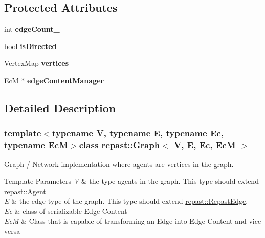 \subsection*{Protected Attributes}
\begin{DoxyCompactItemize}
\item 
\hypertarget{classrepast_1_1_graph_a4cf91f79bf224e8550d31a500fc2a47a}{int {\bfseries edge\-Count\-\_\-}}\label{classrepast_1_1_graph_a4cf91f79bf224e8550d31a500fc2a47a}

\item 
\hypertarget{classrepast_1_1_graph_a31bc527fc394104d5d2252d7302e8bff}{bool {\bfseries is\-Directed}}\label{classrepast_1_1_graph_a31bc527fc394104d5d2252d7302e8bff}

\item 
\hypertarget{classrepast_1_1_graph_a12f010263d0a805926ff66e54dbd8ae5}{Vertex\-Map {\bfseries vertices}}\label{classrepast_1_1_graph_a12f010263d0a805926ff66e54dbd8ae5}

\item 
\hypertarget{classrepast_1_1_graph_ab4cab2042913e901d8a9eb2c170da6de}{Ec\-M $\ast$ {\bfseries edge\-Content\-Manager}}\label{classrepast_1_1_graph_ab4cab2042913e901d8a9eb2c170da6de}

\end{DoxyCompactItemize}


\subsection{Detailed Description}
\subsubsection*{template$<$typename V, typename E, typename Ec, typename Ec\-M$>$class repast\-::\-Graph$<$ V, E, Ec, Ec\-M $>$}

\hyperlink{classrepast_1_1_graph}{Graph} / Network implementation where agents are vertices in the graph. 


\begin{DoxyTemplParams}{Template Parameters}
{\em V} & the type agents in the graph. This type should extend \hyperlink{classrepast_1_1_agent}{repast\-::\-Agent} \\
\hline
{\em E} & the edge type of the graph. This type should extend \hyperlink{classrepast_1_1_repast_edge}{repast\-::\-Repast\-Edge}. \\
\hline
{\em Ec} & class of serializable Edge Content \\
\hline
{\em Ec\-M} & Class that is capable of transforming an Edge into Edge Content and vice versa \\
\hline
\end{DoxyTemplParams}


